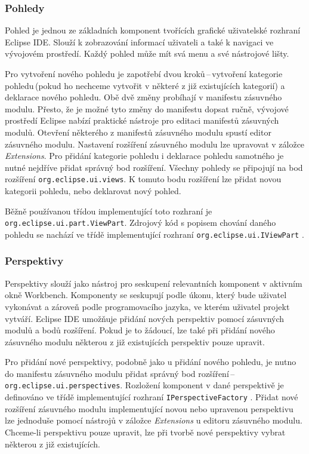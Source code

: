       \subsubsection{Pohledy}
      Pohled je jednou ze základních komponent tvořících grafické uživatelské rozhraní Eclipse IDE. Slouží k zobrazování informací uživateli a také k navigaci ve vývojovém prostředí. Každý pohled může mít svá menu a své nástrojové lišty.
      
      Pro vytvoření nového pohledu je zapotřebí dvou kroků\,--\,vytvoření kategorie pohledu\,(pokud ho nechceme vytvořit v některé z již existujících kategorií) a deklarace nového pohledu. Obě dvě změny probíhají v manifestu zásuvného modulu. Přesto, že je možné tyto změny do manifestu dopsat ručně, vývojové prostředí Eclipse nabízí praktické nástroje pro editaci manifestů zásuvných modulů. Otevření některého z manifestů zásuvného modulu spustí editor zásuvného modulu. Nastavení rozšíření zásuvného modulu lze upravovat v záložce \emph{Extensions}. Pro přidání kategorie pohledu i deklarace pohledu samotného je nutné nejdříve přidat správný bod rozšíření. Všechny pohledy se připojují na bod rozšíření \texttt{org.eclipse.ui.views}. K tomuto bodu rozšíření lze přidat novou kategorii pohledu, nebo deklarovat nový pohled.

      Běžně používanou třídou implementující toto rozhraní je \texttt{org.eclipse.ui.part.ViewPart}. Zdrojový kód s popisem chování daného pohledu se nachází ve třídě implementující rozhraní \texttt{org.eclipse.ui.IViewPart} \cite{Plugins}.

      \subsubsection{Perspektivy}
      Perspektivy slouží jako nástroj pro seskupení relevantních komponent v aktivním okně Workbench. Komponenty se seskupují podle úkonu, který bude uživatel vykonávat a  zároveň podle programovacího jazyka, ve kterém uživatel projekt vytváří. Eclipse IDE umožňuje přidání nových perspektiv pomocí zásuvných modulů a bodů rozšíření. Pokud je to žádoucí, lze také při přidání nového zásuvného modulu některou z již existujících perspektiv pouze upravit.

      Pro přidání nové perspektivy, podobně jako u přidání nového pohledu, je nutno do manifestu zásuvného modulu přidat správný bod rozšíření\,--\,\texttt{org.eclipse.ui.perspectives}. Rozložení komponent v dané perspektivě je definováno ve třídě implementující rozhraní \texttt{IPerspectiveFactory} \cite{Plugins}. Přidat nové rozšíření zásuvného modulu implementující novou nebo upravenou perspektivu lze jednoduše pomocí nástrojů v záložce \emph{Extensions} u editoru zásuvného modulu. Chceme-li perspektivu pouze upravit, lze při tvorbě nové perspektivy vybrat některou z již existujících.

